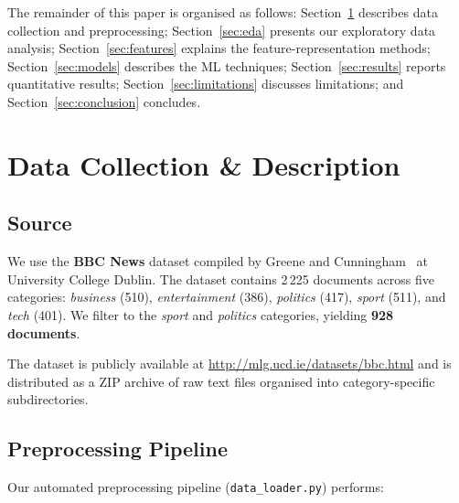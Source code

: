 \documentclass[conference, 10pt]{IEEEtran}
\begin{document}
The remainder of this paper is organised as follows: Section~\ref{sec:data} describes data collection and preprocessing; Section~\ref{sec:eda} presents our exploratory data analysis; Section~\ref{sec:features} explains the feature-representation methods; Section~\ref{sec:models} describes the ML techniques; Section~\ref{sec:results} reports quantitative results; Section~\ref{sec:limitations} discusses limitations; and Section~\ref{sec:conclusion} concludes.

\section{Data Collection \& Description}
\label{sec:data}

\subsection{Source}

We use the \textbf{BBC News} dataset compiled by Greene and Cunningham~\cite{greene2006} at University College Dublin.
The dataset contains 2\,225 documents across five categories: \emph{business} (510), \emph{entertainment} (386), \emph{politics} (417), \emph{sport} (511), and \emph{tech} (401).
We filter to the \emph{sport} and \emph{politics} categories, yielding \textbf{928 documents}.

The dataset is publicly available at \url{http://mlg.ucd.ie/datasets/bbc.html} and is distributed as a ZIP archive of raw text files organised into category-specific subdirectories.

\subsection{Preprocessing Pipeline}

Our automated preprocessing pipeline (\texttt{data\_loader.py}) performs:
\end{document}
